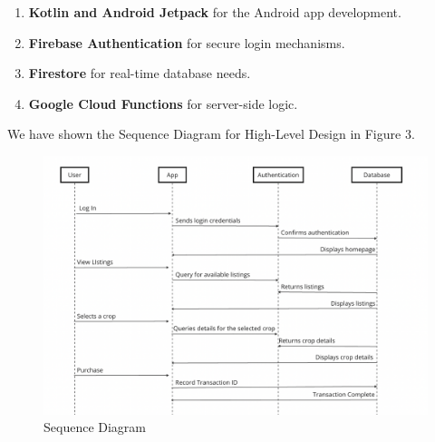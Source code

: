 \documentclass{article}
\begin{document}
\begin{enumerate}
    \item \textbf{Kotlin and Android Jetpack} for the Android app development.
    \item \textbf{Firebase Authentication} for secure login mechanisms.
    \item \textbf{Firestore} for real-time database needs.
    \item \textbf{Google Cloud Functions} for server-side logic.
\end{enumerate}
We have shown the Sequence Diagram for High-Level Design in Figure 3.
\begin{figure}[htbp]
  \centering
  \includegraphics[width=1\linewidth]{image.png}
  \caption{Sequence Diagram}
\end{figure}
\FloatBarrier
\end{document}
